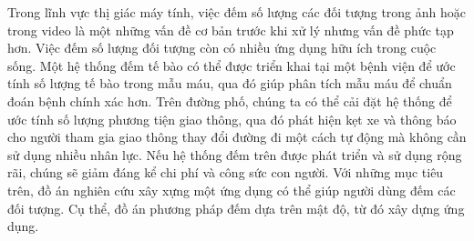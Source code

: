 \begin{vnabstract}
    
Trong lĩnh vực thị giác máy tính, việc đếm số lượng các đối tượng trong ảnh hoặc trong video là một những vấn đề cơ bản trước khi xử lý nhưng vấn đề phức tạp hơn. Việc đếm số lượng đối tượng còn có nhiều ứng dụng hữu ích trong cuộc sống. Một hệ thống đếm tế bào có thể được triển khai tại một bệnh viện để ước tính số lượng tế bào trong mẫu máu, qua đó giúp phân tích mẫu máu để chuẩn đoán bệnh chính xác hơn. Trên đường phố, chúng ta có thể cải đặt hệ thống để ước tính số lượng phương tiện giao thông, qua đó phát hiện kẹt xe và thông báo cho người tham gia giao thông thay đổi đường đi một cách tự động mà không cần sử dụng nhiều nhân lực. Nếu hệ thống đếm trên được phát triển và sử dụng rộng rãi, chúng sẽ giảm đáng kể chi phí và công sức con người. Với những mục tiêu trên, đồ án nghiên cứu xây xựng một ứng dụng có thể giúp người dùng đếm các đối tượng. Cụ thể, đồ án phương pháp đếm dựa trên mật độ, từ đó xây dựng ứng dụng. 

\end{vnabstract}